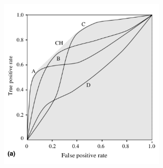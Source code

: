 \documentclass[aspectratio=169]{beamer}
\begin{document}
\begin{frame}

\begin{center}
\includegraphics[width=0.6\textwidth]{figures/fawcett_introduction_2006_fig7a}
\end{center}

\end{frame}
\frame{\titlepage}
\end{document}
